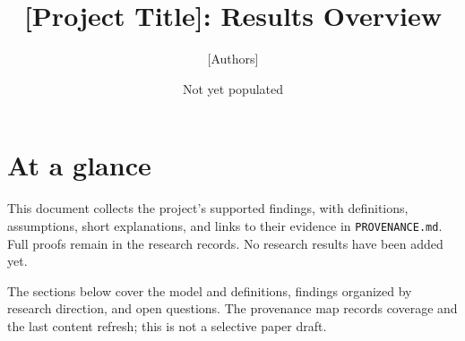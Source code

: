 \documentclass[11pt]{article}
\title{[Project Title]: Results Overview}
\author{[Authors]}
\date{Not yet populated}
\theoremstyle{definition}
\theoremstyle{remark}
\begin{document}
\maketitle

\section*{At a glance}
This document collects the project's supported findings, with definitions,
assumptions, short explanations, and links to their evidence in
\texttt{PROVENANCE.md}. Full proofs remain in the research records.
No research results have been added yet.

The sections below cover the model and definitions, findings organized by
research direction, and open questions. The provenance map records coverage
and the last content refresh; this is not a selective paper draft.

\tableofcontents




% 
% 
\end{document}
